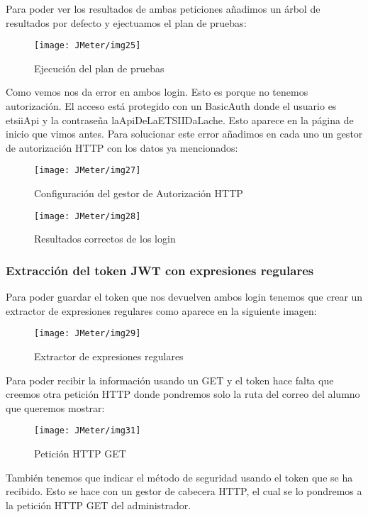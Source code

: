 Para poder ver los resultados de ambas peticiones añadimos un árbol de resultados por defecto y ejectuamos el plan de pruebas:

\begin{figure}[H]
    \centering
    \texttt{[image: JMeter/img25]}
    \caption{Ejecución del plan de pruebas}
\end{figure}

Como vemos nos da error en ambos login. Esto es porque no tenemos autorización. El acceso está protegido con un BasicAuth donde el usuario es etsiiApi y la contraseña laApiDeLaETSIIDaLache. Esto aparece en la página de inicio que vimos antes.
Para solucionar este error añadimos en cada uno un gestor de autorización  HTTP con los datos ya mencionados:

\begin{figure}[H]
    \centering
    \texttt{[image: JMeter/img27]}
    \caption{Configuración del gestor de Autorización HTTP}
\end{figure}

\begin{figure}[H]
    \centering
    \texttt{[image: JMeter/img28]}
    \caption{Resultados correctos de los login}
\end{figure}

\subsubsection{Extracción del token JWT con expresiones regulares}

Para poder guardar el token que nos devuelven ambos login tenemos que crear un extractor de expresiones regulares como aparece en la siguiente imagen:

\begin{figure}[H]
    \centering
    \texttt{[image: JMeter/img29]}
    \caption{Extractor de expresiones regulares}
\end{figure}

Para poder recibir la información usando un GET y el token hace falta que creemos otra petición HTTP donde pondremos solo la ruta del correo del alumno que queremos mostrar:

\begin{figure}[H]
    \centering
    \texttt{[image: JMeter/img31]}
    \caption{Petición HTTP GET}
\end{figure}

También tenemos que indicar el método de seguridad usando el token que se ha recibido. Esto se hace con un gestor de cabecera HTTP, el cual se lo pondremos a la petición HTTP GET del administrador.

